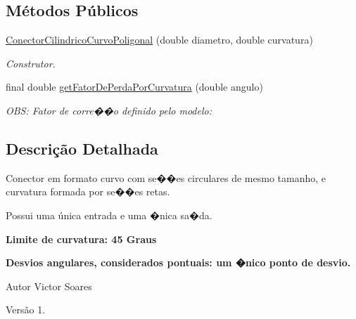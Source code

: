 \subsection*{Métodos Públicos}
\begin{DoxyCompactItemize}
\item 
\hyperlink{classusina_1_1tubulacao_1_1_conector_cilindrico_curvo_poligonal_af24992a287a6fb4d6513f2ba2e27fb25}{Conector\-Cilindrico\-Curvo\-Poligonal} (double diametro, double curvatura)
\begin{DoxyCompactList}\small\item\em Construtor. \end{DoxyCompactList}\item 
final double \hyperlink{classusina_1_1tubulacao_1_1_conector_cilindrico_curvo_poligonal_afe1517f6757b99afd227c4a57952e519}{get\-Fator\-De\-Perda\-Por\-Curvatura} (double angulo)
\begin{DoxyCompactList}\small\item\em O\-B\-S\-: Fator de corre��o definido pelo modelo\-: \end{DoxyCompactList}\end{DoxyCompactItemize}


\subsection{Descrição Detalhada}
{\ttfamily Conector} em formato curvo com se��es circulares de mesmo tamanho, e curvatura formada por se��es retas. 

Possui uma única entrada e uma �nica sa�da. 

{\bfseries Limite de curvatura\-: 45 Graus} 

{\bfseries Desvios angulares, considerados pontuais\-: um �nico ponto de desvio.} 

\begin{DoxyAuthor}{Autor}
Victor Soares 
\end{DoxyAuthor}
\begin{DoxyVersion}{Versão}
1. 
\end{DoxyVersion}


